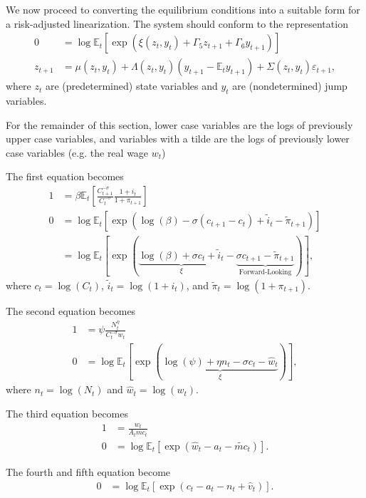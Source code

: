 \documentclass[12 pt, oneside]{article}
\theoremstyle{definition}
\theoremstyle{definition}
\theoremstyle{definition}
\newcommand{\E}{\mathbb{E}}
\newcommand{\fd}{\vspace{2.5mm}}
\begin{document}
We now proceed to converting the equilibrium conditions into a suitable form for a risk-adjusted linearization. The system should conform to the representation
\begin{align*}
  0 & = \log \E_t\left[\exp\left(\xi(z_t, y_t) + \Gamma_5 z_{t + 1} + \Gamma_6 y_{t + 1}\right)\right]\\
  z_{t + 1} & = \mu(z_t, y_t) + \Lambda(z_t, y_t) (y_{t + 1} - \E_t y_{t + 1}) + \Sigma(z_t, y_t) \varepsilon_{t + 1},
\end{align*}
where $z_t$ are (predetermined) state variables and $y_t$ are (nondetermined) jump variables.

For the remainder of this section, lower case variables are the logs of previously upper case variables, and variables with a tilde are the logs of previously lower case variables (e.g. the real wage $w_t$)

\fd

The first equation becomes
\begin{align*}
  1 & = \beta \E_t\left[\frac{C_{t + 1}^{-\sigma}}{C_t^{-\sigma}}\frac{ 1 + i_t}{1 + \pi_{t + 1}}\right]\\
  0 & = \log\E_t\left[\exp\left(\log(\beta) -\sigma (c_{t + 1} - c_t) + \tilde{i}_t - \tilde{\pi}_{t + 1} \right)\right]\\
    & = \log\E_t\left[\exp\left(\underbrace{\log(\beta) + \sigma c_t + \tilde{i}_t}_{\xi} - \underbrace{\sigma c_{t + 1} - \tilde{\pi}_{t + 1}}_{\text{Forward-Looking}} \right)\right],
\end{align*}
where $c_t = \log(C_t)$, $\tilde{i}_t = \log(1 + i_t)$, and $\tilde{\pi}_t = \log(1 + \pi_{t + 1})$.

\fd

The second equation becomes
\begin{align*}
  1 & = \psi\frac{N_t^\eta}{C_t^{-\sigma} w_t}\\
  0 & = \log \E_t\left[\exp\left(\underbrace{\log(\psi) + \eta n_t - \sigma c_t - \hat{w}_t}_{\xi}\right)\right],
\end{align*}
where $n_t = \log(N_t)$ and $\hat{w}_t = \log(w_t)$.

\fd

The third equation becomes
\begin{align*}
  1 & = \frac{w_t}{A_t mc_t}\\
  0 & = \log\E_t\left[\exp\left(\hat{w}_t - a_t - \tilde{mc}_t \right)\right].
\end{align*}

The fourth and fifth equation become
\begin{align*}
  0 & = \log\E_t\left[\exp\left(c_t - a_t - n_t + \hat{v}_t \right)\right].
\end{align*}
\end{document}

